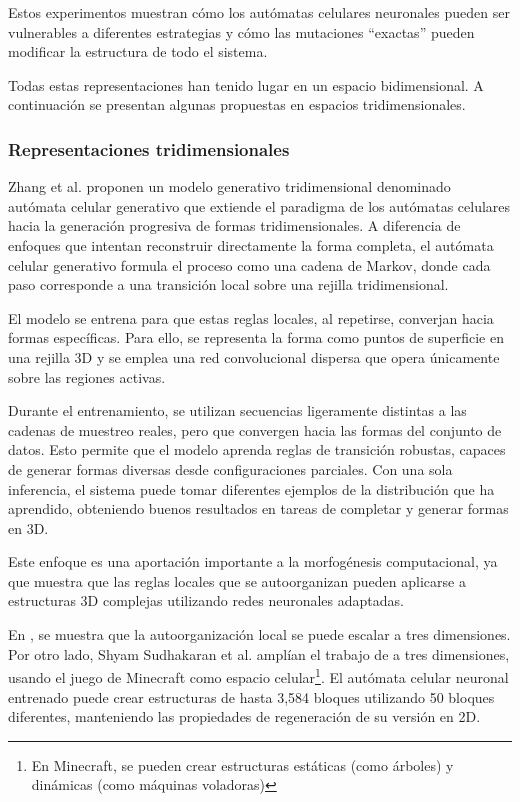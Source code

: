 Estos experimentos muestran cómo los autómatas celulares neuronales pueden ser vulnerables a diferentes estrategias y cómo las mutaciones ``exactas'' pueden modificar la estructura de todo el sistema.

Todas estas representaciones han tenido lugar en un espacio bidimensional. A continuación se presentan algunas propuestas en espacios tridimensionales. 

\subsubsection{Representaciones tridimensionales}

Zhang et al. \cite{zhang2021_gca} proponen un modelo generativo tridimensional denominado autómata celular generativo que extiende el paradigma de los autómatas celulares hacia la generación progresiva de formas tridimensionales. A diferencia de enfoques que intentan reconstruir directamente la forma completa, el autómata celular generativo formula el proceso como una cadena de Markov, donde cada paso corresponde a una transición local sobre una rejilla tridimensional. 

El modelo se entrena para que estas reglas locales, al repetirse, converjan hacia formas específicas. Para ello, se representa la forma como puntos de superficie en una rejilla 3D y se emplea una red convolucional dispersa que opera únicamente sobre las regiones activas.

Durante el entrenamiento, se utilizan secuencias ligeramente distintas a las cadenas de muestreo reales, pero que convergen hacia las formas del conjunto de datos. Esto permite que el modelo aprenda reglas de transición robustas, capaces de generar formas diversas desde configuraciones parciales. Con una sola inferencia, el sistema puede tomar diferentes ejemplos de la distribución que ha aprendido, obteniendo buenos resultados en tareas de completar y generar formas en 3D.

Este enfoque es una aportación importante a la morfogénesis computacional, ya que muestra que las reglas locales que se autoorganizan pueden aplicarse a estructuras 3D complejas utilizando redes neuronales adaptadas.

En \cite{zhang2021_gca}, se muestra que la autoorganización local se puede escalar a tres dimensiones. Por otro lado, Shyam Sudhakaran et al. \cite{sudhakaran2021_nca_3d} amplían el trabajo de \cite{mordvintsev2020_nca} a tres dimensiones, usando el juego de Minecraft como espacio celular\footnote{En Minecraft, se pueden crear estructuras estáticas (como árboles) y dinámicas (como máquinas voladoras)}. El autómata celular neuronal entrenado puede crear estructuras de hasta 3,584 bloques utilizando 50 bloques diferentes, manteniendo las propiedades de regeneración de su versión en 2D.

